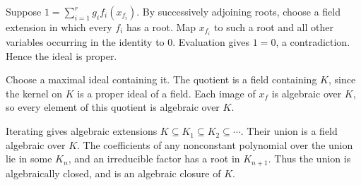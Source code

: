 Suppose $1=\sum_{i=1}^r g_if_i(x_{f_i})$. By successively adjoining roots, choose a field extension in which every $f_i$ has a root. Map $x_{f_i}$ to such a root and all other variables occurring in the identity to $0$. Evaluation gives $1=0$, a contradiction. Hence the ideal is proper.

Choose a maximal ideal containing it. The quotient is a field containing $K$, since the kernel on $K$ is a proper ideal of a field. Each image of $x_f$ is algebraic over $K$, so every element of this quotient is algebraic over $K$.

Iterating gives algebraic extensions $K\subseteq K_1\subseteq K_2\subseteq\cdots$. Their union is a field algebraic over $K$. The coefficients of any nonconstant polynomial over the union lie in some $K_n$, and an irreducible factor has a root in $K_{n+1}$. Thus the union is algebraically closed, and is an algebraic closure of $K$.
